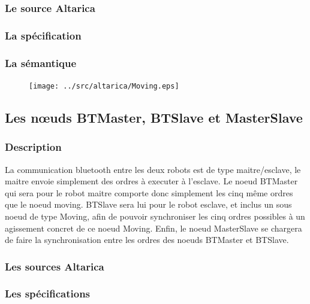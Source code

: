    \subsubsection{Le source Altarica}
   
   
   \subsubsection{La spécification}
   
 
   \subsubsection{La sémantique}
   \begin{figure}[!ht]
    \begin{center}
     \texttt{[image: ../src/altarica/Moving.eps]}
    \end{center}
   \end{figure}

  \subsection{Les n\oe{}uds BTMaster, BTSlave et MasterSlave}
  
   \subsubsection{Description}
   La communication bluetooth entre les deux robots est de type
   maitre/esclave, le maitre envoie simplement des ordres à executer à
   l'esclave. Le noeud BTMaster qui sera pour le robot maitre comporte
   donc simplement les cinq même ordres que le noeud moving. BTSlave
   sera lui pour le robot esclave, et inclus un sous noeud de type
   Moving, afin de pouvoir synchroniser les cinq ordres possibles à un
   agissement concret de ce noeud Moving. Enfin, le noeud MasterSlave se
   chargera de faire la synchronisation entre les ordres des noeuds
   BTMaster et BTSlave.

   \subsubsection{Les sources Altarica}
   
   
   
   
   \subsubsection{Les spécifications}
   
   
   


